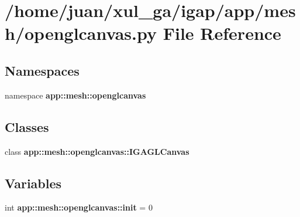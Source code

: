 \section{/home/juan/xul\_\-ga/igap/app/mesh/openglcanvas.py File Reference}
\label{mesh_2openglcanvas_8py}
\subsection*{Namespaces}
\begin{CompactItemize}
\item 
namespace {\bf app::mesh::openglcanvas}
\end{CompactItemize}
\subsection*{Classes}
\begin{CompactItemize}
\item 
class {\bf app::mesh::openglcanvas::IGAGLCanvas}
\end{CompactItemize}
\subsection*{Variables}
\begin{CompactItemize}
\item 
int {\bf app::mesh::openglcanvas::init} = 0
\end{CompactItemize}
